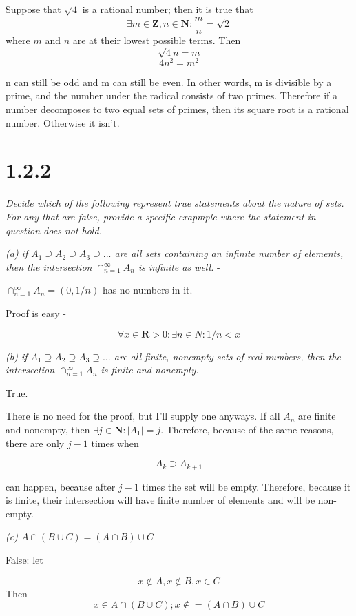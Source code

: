 \documentclass[11pt,oneside,titlepage]{article}
\begin{document}
Suppose that $\sqrt{4}$ is a rational number; then it is true that
$$\exists m \in \textbf{Z}, n \in \textbf{N}: \frac{m}{n} = \sqrt{2}$$
where $m$ and $n$ are at their lowest possible terms. Then
$$\sqrt{4}n = m$$
$$4n^2 = m^2$$

n can still be odd and m can still be even. In other words, m is divisible by
a prime, and the number under the radical consists of two primes. Therefore
if a number decomposes to two equal sets of primes, then its square root is
a rational number. Otherwise it isn't.

\section*{1.2.2}

\textit{Decide which of the following represent true statements about the
  nature of sets. For any that are false, provide a specific exapmple where the
  statement in question does not hold.}

\textit{(a) if $A_1 \supseteq A_2 \supseteq A_3 \supseteq ... $ are all sets
  containing an infinite number of elements, then the intersection
  $\cap_{n = 1}^{\infty} A_n$ is infinite as well.} -

$\cap_{n = 1}^{\infty} A_n = (0, 1/n)$ has no numbers in it.

Proof is easy -

$$\forall x \in \textbf{R} > 0: \exists n \in N: 1/n < x$$

\textit{(b) if $A_1 \supseteq A_2 \supseteq A_3 \supseteq ... $ are all finite,
  nonempty sets of real numbers, then the intersection
  $\cap_{n = 1}^{\infty} A_n$ is finite and nonempty.} -

True.

There is no need for the proof, but I'll supply one anyways. If all $A_n$ are
finite and nonempty, then $\exists j \in \textbf{N} : |A_1| = j$. Therefore,
because of the same reasons, there are only $j - 1$ times when

$$A_k \supset A_{k + 1}$$

can happen, because after $j - 1$ times the set will be empty. Therefore,
because it is finite, their intersection will have finite number of
elements and will be non-empty.

\textit{(c) $A \cap (B \cup C) = (A \cap B) \cup C$}

False: let

$$x \notin A, x \notin B, x \in C$$
Then
$$x \in A \cap (B \cup C); x \notin = (A \cap B) \cup C$$
\end{document}
